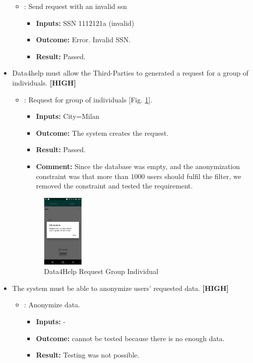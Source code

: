\documentclass[a4paper, hidelinks, 12pt]{report}
\newcommand\requirement[1]{\item[{[REQ-#1]}] }
\newcommand\test[1]{\item[{[TEST-#1]}] }
\begin{document}
\begin{itemize}
\begin{itemize}
		\test{8} : Send request with an invalid ssn
			\begin{itemize}
			\item \textbf{Inputs: } SSN 1112121a (invalid)
			\item \textbf{Outcome: } Error. Invalid SSN.
			\item \textbf{Result: } Passed. 
			 \end{itemize}	
	\end{itemize}
	
	\requirement{10} Data4help must allow the Third-Parties to generated a request for a group of individuals.  \textbf{[HIGH]}
	
						\begin{itemize}
		\test{9}: Request for group of individuals [Fig. \ref{fig:request_group_individuals}].
			\begin{itemize}
			\item \textbf{Inputs: } City=Milan	
			\item \textbf{Outcome: } The system creates the request.
			\item \textbf{Result: } Passed.
			\item \textbf{Comment: } Since the database was empty, and the anonymization constraint was that more than 1000 users should fulfil the filter, we removed the constraint and tested the requirement.    
			\end{itemize}
			\begin{figure}[H]
					\centering
				\includegraphics[width=0.2\textwidth]{images/request_group_individuals.jpeg}
					\caption[Data4Help Request Group Individual]{Data4Help Request Group Individual}
				\label{fig:request_group_individuals}
			\end{figure}

	\end{itemize}
	
	\requirement{11} The system must be able to anonymize users’ requested data. \textbf{[HIGH]}
	\begin{itemize}
		\test{10}: Anonymize data.
			\begin{itemize}
			\item \textbf{Inputs: } -			
			\item \textbf{Outcome: } cannot be tested because there is no enough data.
			\item \textbf{Result: } Testing was not possible. 
			\end{itemize}	
	\end{itemize}
	

\end{itemize}
\end{document}
